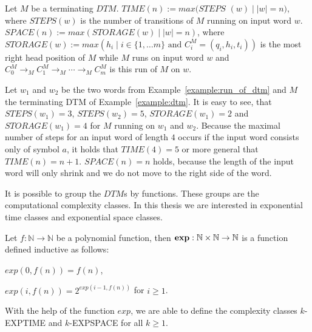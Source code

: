 \begin{definition}
    Let $M$ be a terminating $\mathit{DTM}$. $\mathit{TIME}(n):= max(\mathit{STEPS}$ $(w)\mid |w| = n)$, where
    $\mathit{STEPS}(w)$ is the number of transitions of $M$ running on input word $w$. $\mathit{SPACE}(n) := max
    (\mathit{STORAGE}(w)\mid |w| = n)$, where $\mathit{STORAGE}(w) := max(h_i\mid i\in\{1, \dots m\} \text{ and }
    C_i^M = (q_i, h_i, t_i))$ is the most right head position of $M$ while $M$ runs on input word $w$ and $C_0^M
    \rightarrow_M
    C_1^M \rightarrow_M \dotsb \rightarrow_M C_m^M$ is this run of $M$ on $w$.
\end{definition}

\begin{example}
    \label{example:time_and_space}
    Let $w_1$ and $w_2$ be the two words from Example~\ref{example:run_of_dtm} and $M$ the terminating DTM of Example~\ref{example:dtm}. It is easy to see, that $\mathit{STEPS}
    (w_1) = 3$, $\mathit{STEPS}(w_2) = 5$, $\mathit{STORAGE}(w_1) = 2$ and $\mathit{STORAGE}(w_1) = 4$ for $M$ running on $w_1$ and $w_2$. Because the maximal number of steps for an input word of length $4$ occurs if the input word consists only of symbol
    $a$, it holds that $\mathit{TIME}(4) = 5$ or more general that $\mathit{TIME}(n) = n + 1$. $\mathit{SPACE}(n) = n$
    holds, because the length of the input word will only shrink and we do not move to the right side of the word.
\end{example}

It is possible to group the $\mathit{DTM}$s by functions. These groups are the computational complexity classes.
In this thesis we are interested in exponential time classes and exponential space classes.

\begin{definition}
    Let $f: \mathbb{N} \rightarrow \mathbb{N}$ be a polynomial function, then $\emph{exp}: \mathbb{N} \times \mathbb{N}
    \rightarrow \mathbb{N}$ is a function defined inductive as follows:
    \begin{compactitem}
        \item $exp(0, f(n)) = f(n)$,
        \item $exp(i, f(n)) = 2^{exp(i - 1, f(n))}$ for $i \geq 1$.
    \end{compactitem}
\end{definition}

With the help of the function $exp$, we are able to define the complexity classes $k$-EXPTIME and $k$-EXPSPACE for
all $k \geq 1$.


